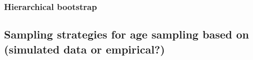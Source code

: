 \documentclass[a4paper 12pt]{article}
\numberwithin{equation}{section}
\begin{document}
%  
%  
  
\subsubsection{Hierarchical bootstrap}
\label{hierarboot}


\subsection{Sampling strategies for age sampling based on (simulated data or empirical?)}
\end{document}
